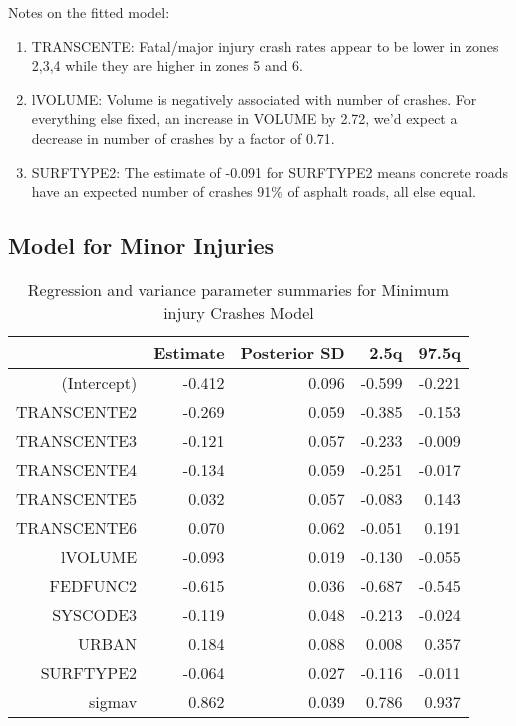 \documentclass[a4paper]{article}\usepackage[]{graphicx}\usepackage[]{color}
\begin{document}
Notes on the fitted model:

\begin{enumerate}
\item
TRANSCENTE: Fatal/major injury crash rates appear to be lower in zones 2,3,4 while they are higher in zones 5 and 6. 

\item
lVOLUME: Volume is negatively associated with number of crashes. For everything else fixed, an increase in VOLUME by 2.72, we'd expect a decrease in number of crashes by a factor of 0.71.

\item
SURFTYPE2: The estimate of -0.091 for SURFTYPE2 means concrete roads have an expected number of crashes 91\% of asphalt roads, all else equal.

\end{enumerate}


\clearpage
\subsection{Model for Minor Injuries}

\begin{table}[h]
\centering
\begin{tabular}{rrrrr}
  \hline
 & Estimate & Posterior SD & 2.5q & 97.5q \\ 
  \hline
(Intercept) & -0.412 & 0.096 & -0.599 & -0.221 \\ 
  TRANSCENTE2 & -0.269 & 0.059 & -0.385 & -0.153 \\ 
  TRANSCENTE3 & -0.121 & 0.057 & -0.233 & -0.009 \\ 
  TRANSCENTE4 & -0.134 & 0.059 & -0.251 & -0.017 \\ 
  TRANSCENTE5 & 0.032 & 0.057 & -0.083 & 0.143 \\ 
  TRANSCENTE6 & 0.070 & 0.062 & -0.051 & 0.191 \\ 
  lVOLUME & -0.093 & 0.019 & -0.130 & -0.055 \\ 
  FEDFUNC2 & -0.615 & 0.036 & -0.687 & -0.545 \\ 
  SYSCODE3 & -0.119 & 0.048 & -0.213 & -0.024 \\ 
  URBAN & 0.184 & 0.088 & 0.008 & 0.357 \\ 
  SURFTYPE2 & -0.064 & 0.027 & -0.116 & -0.011 \\ 
  sigmav & 0.862 & 0.039 & 0.786 & 0.937 \\ 
   \hline
\end{tabular}
\caption{Regression and variance parameter summaries for Minimum injury Crashes Model} 
\label{mincrash}
\end{table}
\end{document}
